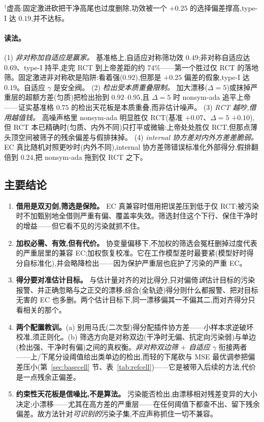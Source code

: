 \documentclass[11pt]{article}
\begin{document}
\noindent$^{\dagger}$虚高:固定激进砍把干净高尾也过度删除,功效被一个 $+0.25$ 的选择偏差撑高,type-I 达 $0.19$,并不达标。

\paragraph{读法。}
(1) \emph{非对称加自适应是赢家。} 基准格上,自适应对称筛功效 $0.49$;非对称自适应达 $0.69$、type-I 持平,走完 RCT 到上帝差距的约 $74\%$——第一个胜过仅 RCT 的落地筛。固定激进非对称砍是陷阱:看着强($0.92$),但那是 $+0.25$ 偏差的假象,type-I 达 $0.19$。自适应 $\gamma$ 是安全阀。
(2) \emph{检出受本质重叠限制。} 加大漂移($\Delta{=}5$)或抹掉严重层的超额方差(匀质)把检出抬到 $0.92$--$0.95$,且 $\Delta{=}5$ 时 nonsym-ada 追平上帝——证实基准格 $0.75$ 的检出天花板是本质重叠,而非估计噪声。
(3) \emph{RCT 越吵,借用越值钱。} 高噪声格里 nonsym-ada 明显胜仅 RCT(基准 $+0.07$、$\Delta{=}5$ $+0.10$),但 RCT 本已精确时(匀质、内外不同)只打平或微输:上帝处处胜仅 RCT,但那点薄头顶空间被筛子的残余偏差与假排抹掉。
(4) \emph{internal 协方差对内外方差差脆弱。} EC 真比随机对照更吵时(内外不同),internal 协方差筛错误标准化外部得分,假排翻倍到 $0.24$,把 nonsym-ada 拖到仅 RCT 之下。

\subsection{主要结论}

\begin{enumerate}
    \item \textbf{借用是双刃剑,筛选是保险。} EC 真兼容时借用把误差压到低于仅 RCT;被污染时不加甄别地全借则严重有偏、覆盖率失效。筛选封住这个下行、保住干净时的增益——但它看不见的污染就抓不住。
    \item \textbf{加权必需、有效,但有代价。} 协变量偏移下,不加权的筛选会冤枉删掉过度代表的严重层里的兼容 EC;加权恢复校准。它在工作模型差时最要紧(模型好时得分自标准化),并会略降检出——因为保护严重层也庇护了污染的严重 EC。
    \item \textbf{得分要对准估计目标。} 与估计量对齐的对比得分,只对偏倚\emph{该}估计目标的污染报警、并正确忽略与之正交的漂移;综合(全轨迹)得分则什么都报警、把对目标无害的 EC 也多删。两个估计目标下,同一漂移偏其一不偏其二,而对齐得分只看相关的那个。
    \item \textbf{两个配置教训。}(a) 别用马氏(二次型)得分配插件协方差——小样本求逆破坏校准,须正则化。(b) 筛选方向是对称双边(干净时无偏、抗定向污染弱)与单边(检出强、干净时有偏)之间的真权衡。\emph{非对称双边筛 $+$ 自适应 $\gamma$} 衔接两者——上/下尾分设阈值给出类单边的检出,而轻的下尾砍与 MSE 最优调参把偏差压小(第~\ref{sec:basecell} 节、表~\ref{tab:refcell})——它是被带入后续的方法,代价是一点残余正偏差。
    \item \textbf{约束性天花板是信噪比,不是算法。} 污染能否检出,由漂移相对残差变异的大小决定;小漂移——尤其在高方差的严重层——在任何阈值下都查不出、留下残余偏差。故方法针对\emph{可识别的}污染子集,不应声称抓住一切不兼容。
\end{enumerate}
\end{document}
